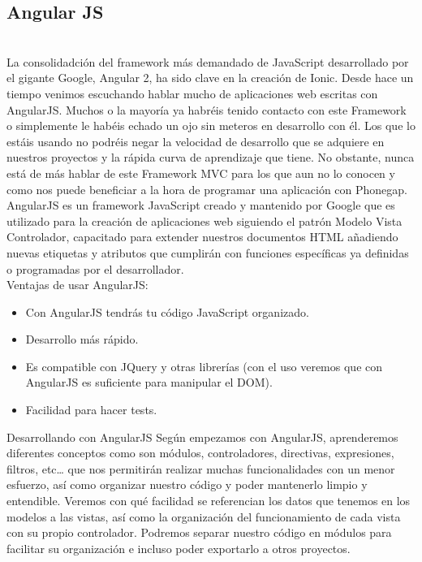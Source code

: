 \documentclass[a4paper, 11pt]{article}
\begin{document}
\begin{itemize}
        \subsection{Angular JS}\\

            La consolidadción del framework más demandado de JavaScript desarrollado
            por el gigante Google, Angular 2, ha sido clave en la creación de Ionic.
            Desde hace un tiempo venimos escuchando hablar mucho de aplicaciones web
            escritas con AngularJS. Muchos o la mayoría ya habréis tenido contacto
            con este Framework o simplemente le habéis echado un ojo sin meteros en
            desarrollo con él. Los que lo estáis usando no podréis negar la
            velocidad de desarrollo que se adquiere en nuestros proyectos y la
            rápida curva de aprendizaje que tiene. No obstante, nunca está de más
            hablar de este Framework MVC para los que aun no lo conocen y como nos
            puede beneficiar a la hora de programar una aplicación con Phonegap.\\

            AngularJS es un framework JavaScript creado y mantenido por Google que es
            utilizado para la creación de aplicaciones web siguiendo el patrón Modelo
            Vista Controlador, capacitado para extender nuestros documentos HTML
            añadiendo nuevas etiquetas y atributos que cumplirán con funciones
            específicas ya definidas o programadas por el desarrollador.\\

            Ventajas de usar AngularJS:
            \begin{itemize}
              \item {Con AngularJS tendrás tu código JavaScript organizado.}
              \item {Desarrollo más rápido.}
              \item {Es compatible con JQuery y otras librerías (con el uso veremos que
                     con AngularJS es suficiente para manipular el DOM).}
              \item {Facilidad para hacer tests.}
            \end{itemize}

            Desarrollando con AngularJS
            Según empezamos con AngularJS, aprenderemos diferentes conceptos como son
            módulos, controladores, directivas, expresiones, filtros, etc… que nos
            permitirán realizar muchas funcionalidades con un menor esfuerzo, así como
            organizar nuestro código y poder mantenerlo limpio y entendible. Veremos
            con qué facilidad se referencian los datos que tenemos en los modelos a
            las vistas, así como la organización del funcionamiento de cada vista con
            su propio controlador. Podremos separar nuestro código en módulos para
            facilitar su organización e incluso poder exportarlo a otros proyectos.


\end{itemize}
\end{document}
